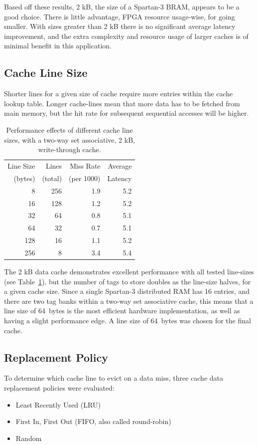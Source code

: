 Based off these results, 2 kB, the size of a Spartan-3 BRAM, appears to be a good
choice. There is little advantage, FPGA resource usage-wise, for going smaller.
With sizes greater than 2 kB there is no significant average latency improvement,
and the extra complexity and resource usage of larger caches is of minimal
benefit in this application.


\subsection{Cache Line Size}
Shorter lines for a given size of cache require more entries within the cache
lookup table. Longer cache-lines mean that more data has to be fetched from main
memory, but the hit rate for subsequent sequential accesses will be higher.

\begin{table}[h!]
\begin{center}
\begin{tabular}{r r r r}
Line Size & Lines   & Miss Rate  & Average \\
 (bytes)  & (total) & (per 1000) & Latency \\
\hline
8   & 256 & 1.9  & 5.2 \\
16  & 128 & 1.2  & 5.2 \\
32  & 64  & 0.8  & 5.1 \\
64  & 32  & 0.7  & 5.1 \\
128 & 16  & 1.1  & 5.2 \\
256 & 8   & 3.4  & 5.4 \\
\end{tabular}
\caption[Cache line-size vs. performance]{Performance effects of different
cache line sizes, with a two-way set associative, 2 kB, write-through cache.}
\label{MEM_Line_Size}
\end{center}
\end{table}

The 2 kB data cache demonstrates excellent performance with all tested line-sizes
(see Table~\ref{MEM_Line_Size}), but the number of tags to store doubles as the
line-size halves, for a given cache size. Since a single Spartan-3 distributed
RAM has 16 entries, and there are two tag banks within a two-way set associative
cache, this means that a line size of 64~bytes is the most efficient hardware
implementation, as well as having a slight performance edge. A line size of
64~bytes was chosen for the final cache.


\subsection{Replacement Policy}
To determine which cache line to evict on a data miss, three cache data
replacement policies were evaluated:
\begin{itemize}
 \item Least Recently Used (LRU)
 \item First In, First Out (FIFO, also called round-robin)
 \item Random
\end{itemize}

